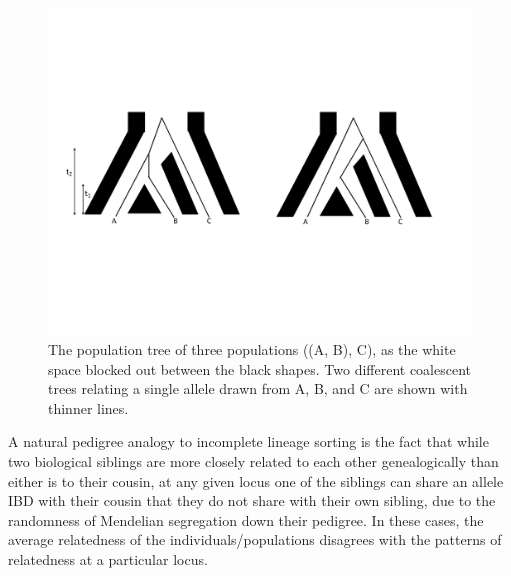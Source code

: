\begin{figure}
\begin{center}
\includegraphics[width=\textwidth]{figures/Genetic_drift/ILS/ILS_coal_cartoon.pdf}
\end{center}
\caption{The population tree of three populations ((A, B), C), as the
  white space blocked out between the black shapes. Two different coalescent trees
relating a single allele drawn from A, B, and C are shown with thinner lines.} \label{fig:ILS_cartoon}
\end{figure}

A natural pedigree analogy to incomplete lineage sorting is the fact that while two
biological siblings are more closely related to each other genealogically than
either is to their cousin, at any given locus one of the siblings can
share an allele IBD with their cousin that they do not share with
their own sibling, due to the randomness of Mendelian segregation down their
pedigree. In these cases, the average relatedness of the individuals/populations disagrees
with the patterns of relatedness at a particular locus.



